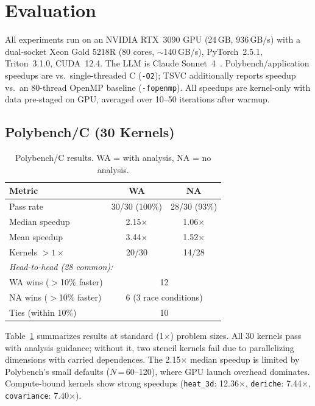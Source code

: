 \documentclass[sigconf]{acmart}
\begin{document}
\section{Evaluation}
\label{sec:eval}

All experiments run on an NVIDIA RTX~3090 GPU (24\,GB,
936\,GB/s) with a dual-socket Xeon Gold 5218R (80 cores,
${\sim}$140\,GB/s), PyTorch~2.5.1, Triton~3.1.0, CUDA~12.4.
The LLM is Claude Sonnet~4~\cite{anthropic2025claude}.
Polybench/application speedups are vs.\ single-threaded C
(\texttt{-O2}); TSVC additionally reports speedup vs.\ an
80-thread OpenMP baseline (\texttt{-fopenmp}).
All speedups are kernel-only with data pre-staged on GPU,
averaged over 10--50 iterations after warmup.

\subsection{Polybench/C (30 Kernels)}

\begin{table}[t]
  \caption{Polybench/C results.  WA = with analysis, NA = no analysis.}
  \label{tab:results_1x}
  \centering\small
  \begin{tabular}{lcc}
    \toprule
    \textbf{Metric} & \textbf{WA} & \textbf{NA} \\
    \midrule
    Pass rate              & 30/30 (100\%) & 28/30 (93\%) \\
    Median speedup         & 2.15$\times$  & 1.06$\times$ \\
    Mean speedup           & 3.44$\times$  & 1.52$\times$ \\
    Kernels $>1\times$     & 20/30         & 14/28         \\
    \midrule
    \multicolumn{3}{l}{\emph{Head-to-head (28 common):}} \\
    WA wins ($>$10\% faster) & \multicolumn{2}{c}{12} \\
    NA wins ($>$10\% faster) & \multicolumn{2}{c}{6 (3 race conditions)}  \\
    Ties (within 10\%)       & \multicolumn{2}{c}{10}  \\
    \bottomrule
  \end{tabular}
\end{table}

Table~\ref{tab:results_1x} summarizes results at standard
(1$\times$) problem sizes.  All 30 kernels pass with analysis
guidance; without it, two stencil kernels fail due to
parallelizing dimensions with carried dependences.
The 2.15$\times$ median speedup is limited by Polybench's
small defaults ($N$\,=\,60--120), where GPU launch overhead
dominates.  Compute-bound kernels show strong speedups
(\texttt{heat\_3d}: 12.36$\times$, \texttt{deriche}:
7.44$\times$, \texttt{covariance}: 7.40$\times$).
\end{document}
